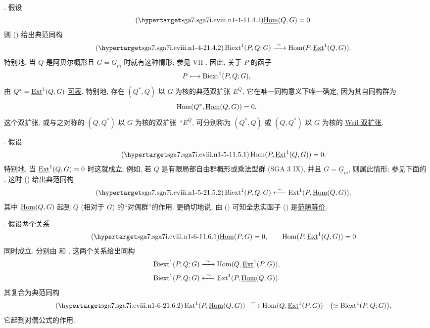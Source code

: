 . 假设
\begin{equation}\tag{\SGARefTarget{sga7.sga7i.eviii.n1-4-1}{1.4.1}}
 \uHom(Q,G)=0.
\end{equation}
则 () 给出典范同构
\begin{equation}\tag{\SGARefTarget{sga7.sga7i.eviii.n1-4-2}{1.4.2}}
 \Biext^1(P,Q;G)
 \xrightarrow{\ \sim\ }
 \Hom(P,\uExt^1(Q,G)).
\end{equation}
特别地, 当 $Q$ 是阿贝尔概形且 $G=\underline G_m$ 时就有这种情形; 参见 VII . 因此, 关于 $P$ 的函子
\[
 P\longmapsto\operatorname{Biext}^1(P,Q;G),
\]
由 $Q^*=\uExt^1(Q,G)$ \underline{可表}. 特别地, 存在 $(Q^*,Q)$ 以 $G$ 为核的典范双扩张 $E^Q$, 它在唯一同构意义下唯一确定, 因为其自同构群为
\[
 \Hom(Q^*,\uHom(Q,G))=0.
\]
这个双扩张, 或与之对称的 $(Q,Q^*)$ 以 $G$ 为核的双扩张 $\,{}^sE^Q$, 可分别称为 $(Q^*,Q)$ 或 $(Q,Q^*)$ 以 $G$ 为核的 \underline{Weil 双扩张}.

. 假设
\begin{equation}\tag{\SGARefTarget{sga7.sga7i.eviii.n1-5-1}{1.5.1}}
 \Hom(P,\uExt^1(Q,G))=0.
\end{equation}
特别地, 当 $\uExt^1(Q,G)=0$ 时这就成立; 例如, 若 $Q$ 是有限局部自由群概形或乘法型群 (SGA 3 IX), 并且 $G=\underline G_m$, 则属此情形; 参见下面的 . 这时 () 给出典范同构
\begin{equation}\tag{\SGARefTarget{sga7.sga7i.eviii.n1-5-2}{1.5.2}}
 \Biext^1(P,Q;G)
 \xleftarrow{\ \sim\ }
 \Ext^1(P,\uHom(Q,G)),
\end{equation}
其中 $\uHom(Q,G)$ 起到 $Q$ (相对于 $G$) 的“对偶群”的作用. 更确切地说, 由 () 可知全忠实函子 () 是\underline{范畴等价}.

. 假设两个关系
\begin{equation}\tag{\SGARefTarget{sga7.sga7i.eviii.n1-6-1}{1.6.1}}
 \uHom(P,G)=0,\qquad
 \Hom(P,\uExt^1(Q,G))=0
\end{equation}
同时成立. 分别由  和 , 这两个关系给出同构
\[
 \Biext^1(P,Q;G)
 \xrightarrow{\ \sim\ }
 \Hom(Q,\uExt^1(P,G)),
\]
\[
 \Biext^1(P,Q;G)
 \xleftarrow{\ \sim\ }
 \Ext^1(P,\uHom(Q,G)).
\]
其复合为典范同构
\begin{equation}\tag{\SGARefTarget{sga7.sga7i.eviii.n1-6-2}{1.6.2}}
 \Ext^1(P,\uHom(Q,G))
 \xrightarrow{\ \sim\ }
 \Hom(Q,\uExt^1(P,G))
 \quad\bigl(\simeq\Biext^1(P,Q;G)\bigr),
\end{equation}
它起到对偶公式的作用.


